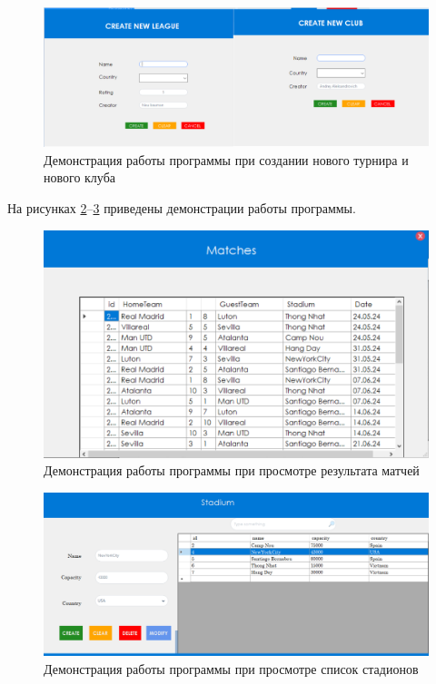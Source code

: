\begin{figure}[h]
	\centering
	\includegraphics[height=0.2\textheight]{img/examples/demon4.png}
	\caption{Демонстрация работы программы при создании нового турнира и нового клуба}
	\label{img:ex3}
\end{figure}

\clearpage
На рисунках \ref{img:ex5}--\ref{img:ex6} приведены демонстрации работы программы.
\begin{figure}[h]
	\centering
	\includegraphics[height=0.3\textheight]{img/examples/demon5.png}
	\caption{Демонстрация работы программы при просмотре результата матчей}
	\label{img:ex5}
\end{figure}

\begin{figure}[h]
	\centering
	\includegraphics[height=0.25\textheight]{img/examples/demon6.png}
	\caption{Демонстрация работы программы при просмотре список стадионов}
	\label{img:ex6}
\end{figure}
\clearpage
